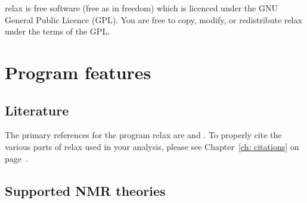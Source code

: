 relax is free software (free as in freedom) which is licenced under the GNU General Public Licence (GPL).
You are free to copy, modify, or redistribute relax under the terms of the GPL.



\section{Program features}



\subsection{Literature}

The primary references for the program relax are \citet{dAuvergneGooley08a} and \citet{dAuvergneGooley08b}.
To properly cite the various parts of relax used in your analysis, please see Chapter~\ref{ch: citations} on page~\pageref{ch: citations}.



\subsection{Supported NMR theories}


